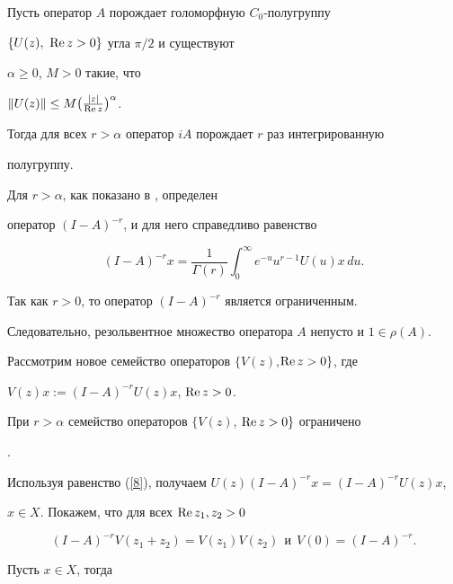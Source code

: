 \begin{thm}\label{6}


Пусть оператор $A$ порождает голоморфную $C_0$-полугруппу


$\{U(z),\ \operatorname{Re} z>0\}$ угла $\pi/2$ и существуют


$\alpha \geq 0$, $M>0$ такие, что


$\|U(z)\|\leq M\big( \frac{|z|}{\operatorname{Re} z}\big)^\alpha$.


Тогда для всех $r>\alpha$  оператор $iA$ порождает $r$ раз интегрированную


полугруппу.


\end{thm}





\begin{pf}


Для $r>\alpha$, как показано в \cite{K}, определен


оператор $(I-A)^{-r}$, и для него справедливо равенство


\begin{equation}\label{8}


(I-A)^{-r}x=\frac{1}{\Gamma(r)}\int^{\infty}_{0}e^{-u}u^{r-1}U(u)x\,du.  


\end{equation}


Так как $r>0$, то оператор $(I-A)^{-r}$ является ограниченным.


Следовательно, резольвентное множество оператора $A$ непусто и $1\in\rho(A)$.


Рассмотрим новое семейство операторов $\{V(z)$,\linebreak $\operatorname{Re} z>0\}$, где 


$V(z)x:= (I-A)^{-r}U(z)x$, $\operatorname{Re} z>0$.


При $r>\alpha$ семейство операторов $\{V(z)$, $\operatorname{Re} z>0\}$ ограничено


\cite{Boyadzhiev}.


Используя равенство (\ref{8}), получаем $U(z)(I-A)^{-r}x=(I-A)^{-r}U(z)x$,


$x\in X$. Покажем, что для всех $\operatorname{Re} z_1, z_2>0$


$$


(I-A)^{-r}V(z_1+z_2)=V(z_1)V(z_2)\  \ \text{и}\ \ V(0)=(I-A)^{-r}.


$$


Пусть $x\in X$, тогда


\begin{gather*}



\end{gather*}
\end{pf}
